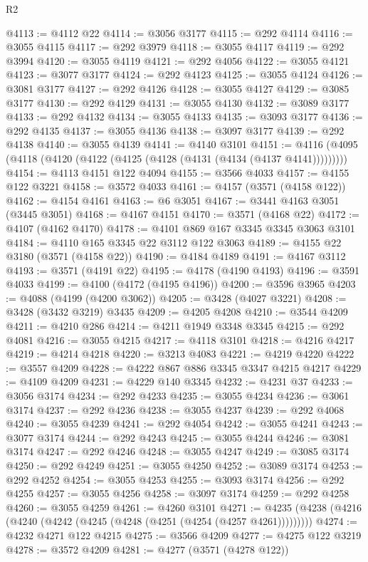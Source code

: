 \begin{lexlean}{R2}
\begin{coremodule}
@4113 := @4112 @22
@4114 := @3056 @3177
@4115 := @292 @4114
@4116 := @3055 @4115
@4117 := @292 @3979
@4118 := @3055 @4117
@4119 := @292 @3994
@4120 := @3055 @4119
@4121 := @292 @4056
@4122 := @3055 @4121
@4123 := @3077 @3177
@4124 := @292 @4123
@4125 := @3055 @4124
@4126 := @3081 @3177
@4127 := @292 @4126
@4128 := @3055 @4127
@4129 := @3085 @3177
@4130 := @292 @4129
@4131 := @3055 @4130
@4132 := @3089 @3177
@4133 := @292 @4132
@4134 := @3055 @4133
@4135 := @3093 @3177
@4136 := @292 @4135
@4137 := @3055 @4136
@4138 := @3097 @3177
@4139 := @292 @4138
@4140 := @3055 @4139
@4141 := @4140 @3101
@4151 := @4116 (@4095 (@4118 (@4120 (@4122 (@4125 (@4128 (@4131 (@4134 (@4137 @4141)))))))))
@4154 := @4113 @4151 @122 @4094
@4155 := @3566 @4033
@4157 := @4155 @122 @3221
@4158 := @3572 @4033
@4161 := @4157 (@3571 (@4158 @122))
@4162 := @4154 @4161
@4163 := @6 @3051
@4167 := @3441 @4163 @3051 (@3445 @3051)
@4168 := @4167 @4151
@4170 := @3571 (@4168 @22)
@4172 := @4107 (@4162 @4170)
@4178 := @4101 @869 @167 @3345 @3345 @3063 @3101
@4184 := @4110 @165 @3345 @22 @3112 @122 @3063
@4189 := @4155 @22 @3180 (@3571 (@4158 @22))
@4190 := @4184 @4189
@4191 := @4167 @3112
@4193 := @3571 (@4191 @22)
@4195 := @4178 (@4190 @4193)
@4196 := @3591 @4033
@4199 := @4100 (@4172 (@4195 @4196))
@4200 := @3596 @3965
@4203 := @4088 (@4199 (@4200 @3062))
@4205 := @3428 (@4027 @3221)
@4208 := @3428 (@3432 @3219) @3435
@4209 := @4205 @4208
@4210 := @3544 @4209
@4211 := @4210 @286
@4214 := @4211 @1949 @3348 @3345
@4215 := @292 @4081
@4216 := @3055 @4215
@4217 := @4118 @3101
@4218 := @4216 @4217
@4219 := @4214 @4218
@4220 := @3213 @4083
@4221 := @4219 @4220
@4222 := @3557 @4209
@4228 := @4222 @867 @886 @3345 @3347 @4215 @4217
@4229 := @4109 @4209
@4231 := @4229 @140 @3345
@4232 := @4231 @37
@4233 := @3056 @3174
@4234 := @292 @4233
@4235 := @3055 @4234
@4236 := @3061 @3174
@4237 := @292 @4236
@4238 := @3055 @4237
@4239 := @292 @4068
@4240 := @3055 @4239
@4241 := @292 @4054
@4242 := @3055 @4241
@4243 := @3077 @3174
@4244 := @292 @4243
@4245 := @3055 @4244
@4246 := @3081 @3174
@4247 := @292 @4246
@4248 := @3055 @4247
@4249 := @3085 @3174
@4250 := @292 @4249
@4251 := @3055 @4250
@4252 := @3089 @3174
@4253 := @292 @4252
@4254 := @3055 @4253
@4255 := @3093 @3174
@4256 := @292 @4255
@4257 := @3055 @4256
@4258 := @3097 @3174
@4259 := @292 @4258
@4260 := @3055 @4259
@4261 := @4260 @3101
@4271 := @4235 (@4238 (@4216 (@4240 (@4242 (@4245 (@4248 (@4251 (@4254 (@4257 @4261)))))))))
@4274 := @4232 @4271 @122 @4215
@4275 := @3566 @4209
@4277 := @4275 @122 @3219
@4278 := @3572 @4209
@4281 := @4277 (@3571 (@4278 @122))

\end{coremodule}
\end{lexlean}
